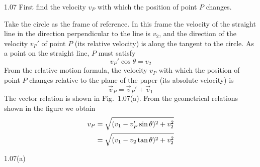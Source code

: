 \begin{solution}{1.07}
First find the velocity $v_P$ with which the position of point $P$ changes.

Take the circle as the frame of reference. In this frame the velocity of the straight line in the direction perpendicular to the line is $v_2$, and the direction of the velocity $v_P'$ of point $P$ (its relative velocity) is along the tangent to the circle. As a point on the straight line, $P$ must satisfy
\begin{equation}
v_P'\cos\theta=v_2 \tag{1}
\end{equation}
From the relative motion formula, the velocity $v_P$ with which the position of point $P$ changes relative to the plane of the paper (its absolute velocity) is
\begin{equation}
\vec{v}_P=\vec{v}_P'+\vec{v}_1 \tag{2}
\end{equation}
The vector relation is shown in Fig.~1.07(a). From the geometrical relations shown in the figure we obtain
\begin{align}
v_P&=\sqrt{(v_1-v_P'\sin\theta)^2+v_2^2}\notag\\
&=\sqrt{(v_1-v_2\tan\theta)^2+v_2^2}\notag
\end{align}

\begin{figbox}{1.07(a)}
\end{figbox}


\end{solution}
